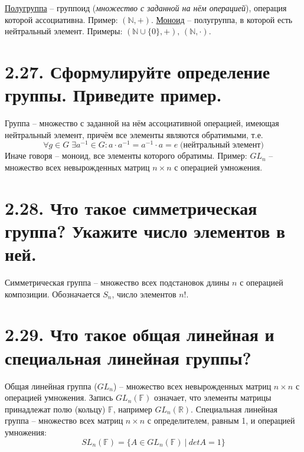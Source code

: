 \documentclass{article}
\begin{document}
\underline{Полугруппа} -- группоид (\textit{множество с заданной на нём операцией}), операция которой ассоциативна. Пример: $(\mathbb{N}, +)$.
\newline \underline{Моноид} -- полугруппа, в которой есть нейтральный элемент.
\newline Примеры: $(\mathbb{N}\cup \{0\}, +),\, (\mathbb{N}, \cdot)$.

\section*{\LARGE 2.27. Сформулируйте определение группы. Приведите пример. }

Группа -- множество с заданной на нём ассоциативной операцией, имеющая нейтральный элемент, причём все элементы являются обратимыми, т.е. 
$$
\forall g \in G \; \exists a^{-1} \in G : a \cdot a^{-1} = a^{-1} \cdot a = e \; \mbox{(нейтральный элемент)}
$$
Иначе говоря -- моноид, все элементы которого обратимы.
\newline Пример: $GL_n$ -- множество всех невырожденных матриц $n \times n$ с операцией умножения.

\section*{\LARGE 2.28. Что такое симметрическая группа? Укажите число элементов в ней.  }

Симметрическая группа -- множество всех подстановок длины $n$ с операцией композиции. Обозначается $S_n$, число элементов $n!$.

\section*{\LARGE 2.29. Что такое общая линейная и специальная линейная группы?  }

Общая линейная группа ($GL_n$) -- множество всех невырожденных матриц $n \times n$ с операцией умножения. Запись $GL_n(\mathbb{F})$ означает, что элементы матрицы принадлежат полю (кольцу) $\mathbb{F}$, например $GL_n(\mathbb{R})$.
\newline Специальная линейная группа -- множество всех матриц $n \times n$ с определителем, равным 1, и операцией умножения:
$$
SL_n(\mathbb{F}) = \{A \in GL_n(\mathbb{F}) \:|\: detA = 1\}
$$
\end{document}

